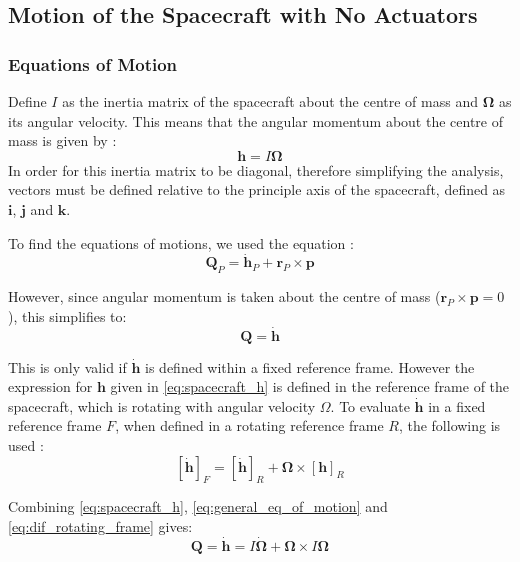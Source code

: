 \documentclass[12]{article}
\begin{document}
\begin{multicols*}{2}
\subsection{Motion of the Spacecraft with No Actuators}

\subsubsection{Equations of Motion}

Define $I$ as the inertia matrix of the spacecraft about the centre of mass and $\bm{\Omega}$ as its angular velocity. This means that the angular momentum about the centre of mass is given by \cite{inertia_matrix}:
\begin{equation} \label{eq:spacecraft_h}
\bm{h} = I\bm{\Omega}
\end{equation}
In order for this inertia matrix to be diagonal, therefore simplifying the analysis, vectors must be defined relative to the principle axis of the spacecraft, defined as $\bm{i}$, $\bm{j}$ and $\bm{k}$.

To find the equations of motions, we used the equation \cite{Q_equals_hdot}:
\begin{equation} \label{eq:general_eq_of_motion}
\bm{Q}_P = \bm{\dot{h}}_P + \bm{r}_P\times \bm{p}
\end{equation}

However, since angular momentum is taken about the centre of mass ($\bm{r}_P \times \bm{p} = 0$), this simplifies to:
\begin{equation} \label{eq:simple_eq_of_motion}
\bm{Q} = \bm{\dot{h}}
\end{equation}

This is only valid if $\dot{\bm{h}}$ is defined within a fixed reference frame. However the expression for $\bm{h}$ given in \cref{eq:spacecraft_h} is defined in the reference frame of the spacecraft, which is rotating with angular velocity $\Omega$. To evaluate $\bm{\dot{h}}$ in a fixed reference frame $F$, when defined in a rotating reference frame $R$, the following is used \cite{dif_rotating_frame}:
\begin{equation} \label{eq:dif_rotating_frame}
\left[ \dot{\bm{h}} \right]_F = \left[ \dot{\bm{h}} \right]_R + \bm{\Omega}\times \left[ \bm{h} \right]_R
\end{equation}

Combining \cref{eq:spacecraft_h}, \cref{eq:general_eq_of_motion} and \cref{eq:dif_rotating_frame} gives:
\begin{equation} \label{eq:euler_equations_vector}
\bm{Q} = \dot{\bm{h}} = I\bm{\dot{\Omega}} + \bm{\Omega}\times I\bm{\Omega}
\end{equation}


\end{multicols*}
\end{document}
